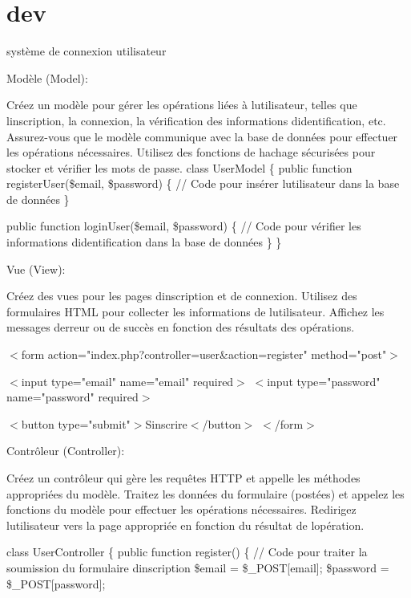 \chapter{dev}
\hypertarget{md_dev}{}\label{md_dev}
système de connexion utilisateur

Modèle (Model)\+:

Créez un modèle pour gérer les opérations liées à l\textquotesingle{}utilisateur, telles que l\textquotesingle{}inscription, la connexion, la vérification des informations d\textquotesingle{}identification, etc. Assurez-\/vous que le modèle communique avec la base de données pour effectuer les opérations nécessaires. Utilisez des fonctions de hachage sécurisées pour stocker et vérifier les mots de passe. class User\+Model \{ public function register\+User(\$email, \$password) \{ // Code pour insérer l\textquotesingle{}utilisateur dans la base de données \}

public function login\+User(\$email, \$password) \{ // Code pour vérifier les informations d\textquotesingle{}identification dans la base de données \} \}

Vue (View)\+:

Créez des vues pour les pages d\textquotesingle{}inscription et de connexion. Utilisez des formulaires HTML pour collecter les informations de l\textquotesingle{}utilisateur. Affichez les messages d\textquotesingle{}erreur ou de succès en fonction des résultats des opérations.

$<$form action="{}index.\+php?controller=user\&action=register"{} method="{}post"{}$>$

$<$input type="{}email"{} name="{}email"{} required$>$ $<$input type="{}password"{} name="{}password"{} required$>$

$<$button type="{}submit"{}$>$S\textquotesingle{}inscrire$<$/button$>$ $<$/form$>$

Contrôleur (Controller)\+:

Créez un contrôleur qui gère les requêtes HTTP et appelle les méthodes appropriées du modèle. Traitez les données du formulaire (postées) et appelez les fonctions du modèle pour effectuer les opérations nécessaires. Redirigez l\textquotesingle{}utilisateur vers la page appropriée en fonction du résultat de l\textquotesingle{}opération.

class User\+Controller \{ public function register() \{ // Code pour traiter la soumission du formulaire d\textquotesingle{}inscription \$email = \$\+\_\+\+POST\mbox{[}\textquotesingle{}email\textquotesingle{}\mbox{]}; \$password = \$\+\_\+\+POST\mbox{[}\textquotesingle{}password\textquotesingle{}\mbox{]};


